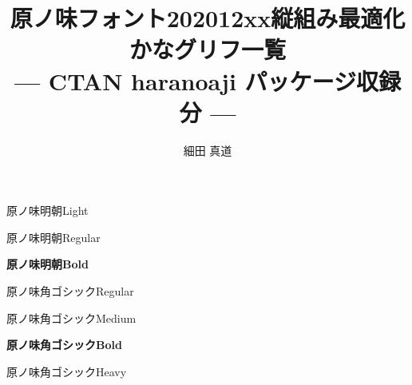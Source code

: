 \documentclass[dvipdfmx]{jsarticle}
\title{原ノ味フォント202012xx縦組み最適化かなグリフ一覧\\
--- CTAN haranoaji パッケージ収録分 ---}
\author{細田 真道}
\begin{document}
\maketitle


\clearpage
\parindent=0pt
\fboxsep=0pt

\mcfamily\ltseries
{\huge 原ノ味明朝\textmd{Light}}

\testAll

\clearpage

\mcfamily\mdseries
{\huge 原ノ味明朝\textmd{Regular}}

\testAll

\clearpage

\mcfamily\bfseries
{\huge 原ノ味明朝\textmd{Bold}}

\testAll

\clearpage

\gtfamily\mdseries
{\huge 原ノ味角ゴシック\textmd{Regular}}

\testAll

\clearpage

\mgfamily %
{\huge 原ノ味角ゴシック\textmd{Medium}}

\testAll

\clearpage

\gtfamily\bfseries
{\huge 原ノ味角ゴシック\textmd{Bold}}

\testAll

\clearpage

\gtfamily\ebseries
{\huge 原ノ味角ゴシック\textmd{Heavy}}

\testAll
\end{document}
